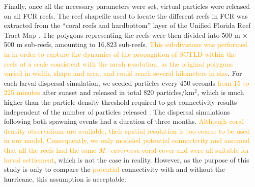 \documentclass[fleqn,10pt]{wlscirep}
\newcommand{\modif}[1]{\textcolor{orange}{#1}}
\begin{document}
Finally, once all the necessary parameters were set, virtual particles were released on all FCR reefs. The reef shapefile used to locate the different reefs in FCR was extracted from the “coral reefs and hardbottom” layer of the Unified Florida Reef Tract Map \citep{FWC2017Jan}. The polygons representing the reefs were then divided into 500 m $\times$ 500 m sub-reefs, amounting to 16,823 sub-reefs. \modif{This subdivisions was performed in \cite{DobbySCTLD} in order to capture the dynamics of the propagation of SCTLD within the reefs at a scale consistent with the mesh resolution, as the original polygons varied in width, shape and area, and could reach several kilometers in size}. For each larval dispersal simulation, we seeded particles every 450 seconds \modif{from 15 to 225 minutes} after sunset and released in total 820 particles/km$^{2}$, which is much higher than the particle density threshold required to get connectivity results independent of the number of particles released \citep{Monroy2017Jan}. The dispersal simulations following both spawning events had a duration of three months. \modif{Although coral density observations are available, their spatial resolution is too coarse to be used in our model. Consequently, we only modeled potential connectivity and assumed that all the reefs had the same \textit{M.~cavernosa} coral cover and were all suitable for larval settlement}, which is not the case in reality. However, as the purpose of this study is only to compare the \modif{potential} connectivity with and without the hurricane, this assumption is acceptable.
\end{document}
